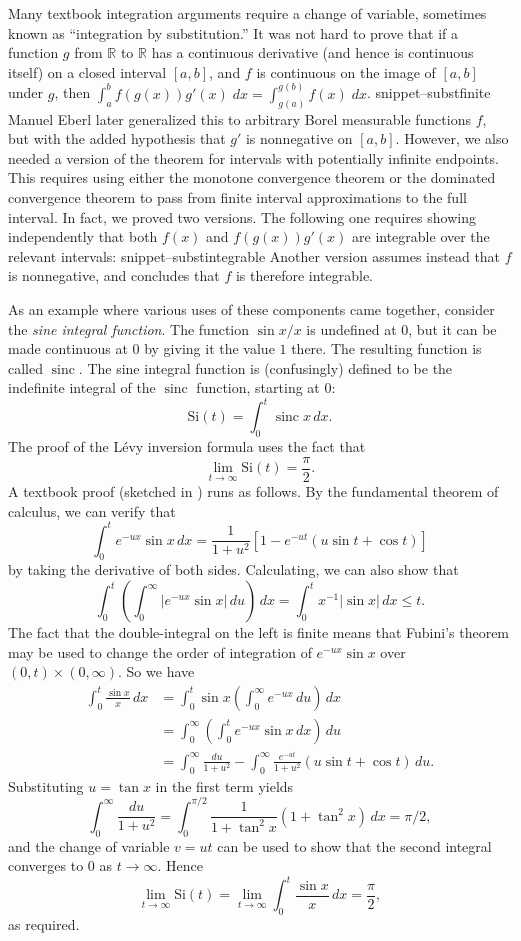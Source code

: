 \documentclass{svjour3}
\newcommand{\RR}{\mathbb{R}}
\newcommand{\fn}[1]{\mathrm{#1}} %
\newcommand{\sinc}{\mathop{\fn{sinc}}\nolimits}
\newcommand{\Snippet}[1]{\csname snippet--#1\endcsname}
\begin{document}
Many textbook integration arguments require a change of variable, sometimes known as ``integration by substitution.'' It was not hard to prove that if a function $g$ from $\RR$ to $\RR$ has a continuous derivative (and hence is continuous itself) on a closed interval $[a,b]$, and $f$ is continuous on the image of $[a, b]$ under $g$, then $\int_a^b f(g(x)) g'(x) \; dx = \int_{g(a)}^{g(b)} f(x) \; dx$.
\Snippet{substfinite}
Manuel Eberl later generalized this to arbitrary Borel measurable functions $f$, but with the added hypothesis that $g'$ is nonnegative on $[a, b]$. However, we also needed a version of the theorem for intervals with potentially infinite endpoints. This requires using either the monotone convergence theorem or the dominated convergence theorem to pass from finite interval approximations to the full interval. In fact, we proved two versions. The following one requires showing independently that both $f(x)$ and $f(g(x)) g'(x)$ are integrable over the relevant intervals:
\Snippet{substintegrable}
Another version assumes instead that $f$ is nonnegative, and concludes that $f$ is therefore integrable.

As an example where various uses of these components came together, consider the \emph{sine integral function}. The function $\sin x / x$ is undefined at $0$, but it can be made continuous at $0$ by giving it the value $1$ there. The resulting function is called $\sinc$. The sine integral function is (confusingly) defined to be the indefinite integral of the $\sinc$ function, starting at $0$:
\[
\fn{Si}(t) = \int_0^t \sinc x \, dx.
\]
The proof of the L\'evy inversion formula uses the fact that
\[
\lim_{t \rightarrow \infty} \fn{Si}(t) = \frac{\pi}{2}.
\]
A textbook proof (sketched in \cite[Example 18.4]{billingsley:95}) runs as follows. By the fundamental theorem of calculus, we can verify that
\[
\int_0^t e^{-ux} \sin x \, dx = \frac{1}{1+u^2}[1 - e^{-ut}(u \sin t + \cos t)]
\]
by taking the derivative of both sides. Calculating, we can also show that
\[
\int_0^t \left( \int_0^\infty |e^{-ux} \sin x| \, du\right) \, dx = \int_0^t x^{-1} |\sin x| \, dx \le t.
\]
The fact that the double-integral on the left is finite means that Fubini's theorem may be used to change the order of integration of $e^{-ux} \sin x$ over $(0,t) \times (0, \infty)$. So we have
\begin{align*}
\int_0^t \frac{\sin x}{x} \, dx &= \int_0^t \sin x \left(\int_0^\infty e^{-ux} \, du\right) \, dx \\
                                &= \int_0^\infty \left(\int_0^t e^{-ux} \sin x \, dx\right) \, du \\
                                &= \int_0^\infty \frac{du}{1+u^2} - \int_0^\infty \frac{e^{-ut}}{1+u^2} (u \sin t + \cos t) \, du.
\end{align*}
Substituting $u = \tan x$ in the first term yields
\[
 \int_0^\infty \frac{du}{1+u^2} = \int_0^{\pi/2} \frac{1}{1 + \tan^2 x} (1 + \tan^2 x) \, dx = \pi/2,
\]
and the change of variable $v = ut$ can be used to show that the second integral converges to $0$ as $t \rightarrow \infty$. Hence
\[
\lim_{t \rightarrow \infty} \fn{Si}(t) = \lim_{t \rightarrow \infty} \int_0^t \frac{\sin x}{x} \, dx = \frac{\pi}{2},
\]
as required.
\end{document}
